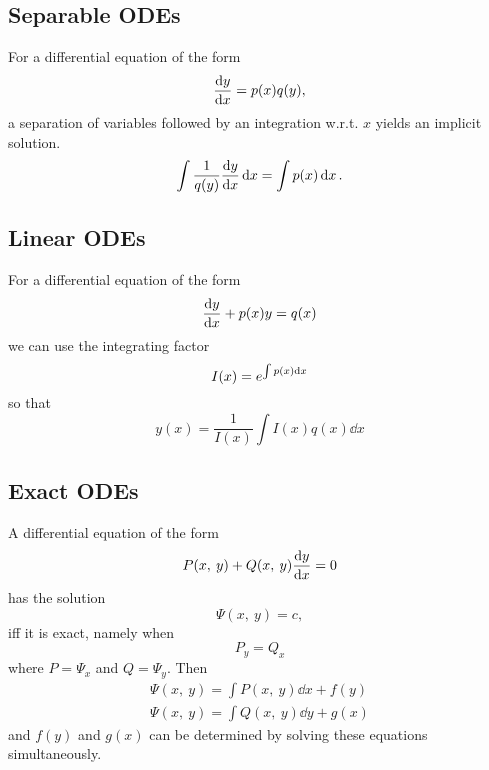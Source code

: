 \documentclass{article}
\begin{document}
\subsection{Separable ODEs}
For a differential equation of the form
\begin{equation*}
    \dv{y}{x} = p(x) q(y),
\end{equation*}
a separation of variables followed by an integration w.r.t. \(x\) yields an implicit solution.
\begin{equation*}
    \int \frac{1}{q(y)} \dv{y}{x} \dd{x} = \int p(x) \dd{x}.
\end{equation*}
\subsection{Linear ODEs}
For a differential equation of the form
\begin{equation*}
    \dv{y}{x} + p(x)y = q(x)
\end{equation*}
we can use the integrating factor
\begin{equation*}
    I(x) = e^{\int p(x) \dd{x}}
\end{equation*}
so that
\begin{equation*}
    y(x) = \frac{1}{I(x)} \int I(x) q(x) \dd{x}
\end{equation*}
\subsection{Exact ODEs}
A differential equation of the form
\begin{equation*}
    P(x,\: y) + Q(x,\: y)\dv{y}{x} = 0
\end{equation*}
has the solution
\begin{equation*}
    \Psi(x,\: y) = c,
\end{equation*}
iff it is exact, namely when
\begin{equation*}
    P_y = Q_x
\end{equation*}
where \(P = \Psi_x\) and \(Q = \Psi_y\). Then
\begin{gather*}
    \Psi(x,\: y) = \int P(x,\: y) \dd{x} + f(y) \\
    \Psi(x,\: y) = \int Q(x,\: y) \dd{y} + g(x)
\end{gather*}
and \(f(y)\) and \(g(x)\) can be determined by solving these equations simultaneously.
\newpage
\end{document}
